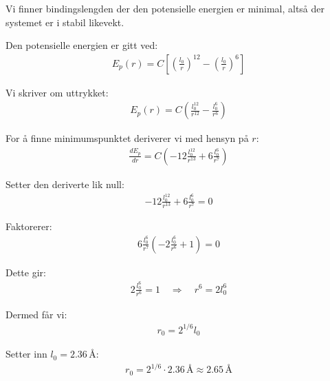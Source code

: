 \subsubsection{}

Vi finner bindingslengden der den potensielle energien er minimal, altså der systemet er i stabil likevekt.

Den potensielle energien er gitt ved:
\begin{align}
E_p(r) = C\left[\left(\frac{l_0}{r}\right)^{12} - \left(\frac{l_0}{r}\right)^6 \right]
\end{align}

Vi skriver om uttrykket:
\begin{align}
E_p(r) = C\left(\frac{l_0^{12}}{r^{12}} - \frac{l_0^6}{r^6}\right)
\end{align}

For å finne minimumspunktet deriverer vi med hensyn på $r$:
\begin{align}
\frac{dE_p}{dr} = C\left(-12\frac{l_0^{12}}{r^{13}} + 6\frac{l_0^6}{r^7}\right)
\end{align}

Setter den deriverte lik null:
\begin{align}
-12\frac{l_0^{12}}{r^{13}} + 6\frac{l_0^6}{r^7} = 0
\end{align}

Faktorerer:
\begin{align}
6\frac{l_0^6}{r^7}\left(-2\frac{l_0^6}{r^6} + 1\right) = 0
\end{align}

Dette gir:
\begin{align}
2\frac{l_0^6}{r^6} = 1 \quad \Rightarrow \quad r^6 = 2l_0^6
\end{align}

Dermed får vi:
\begin{align}
r_0 = 2^{1/6} l_0
\end{align}

Setter inn $l_0 = 2.36\,\text{\AA}$:
\begin{align}
r_0 = 2^{1/6} \cdot 2.36\,\text{\AA} \approx 2.65\,\text{\AA}
\end{align}

\begin{figure}[H]
\centering

\caption{}
\end{figure}

\newpage




\newpage